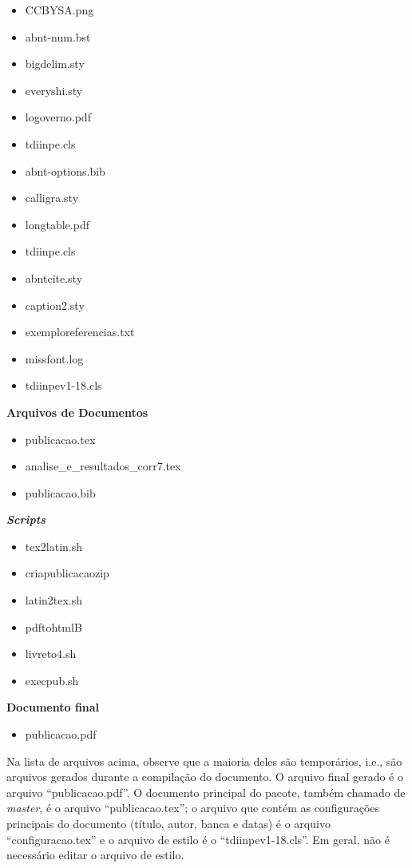 \begin{multicols}{3}
\begin{itemize}
        \item CCBYSA.png
        \item abnt-num.bst
        \item bigdelim.sty
        \item everyshi.sty
        \item logoverno.pdf
        \item tdiinpe.cls
        \item abnt-options.bib
        \item calligra.sty
        \item longtable.pdf
        \item tdiinpe.cls~
        \item abntcite.sty
        \item caption2.sty
        \item exemploreferencias.txt
        \item missfont.log
        \item tdiinpev1-18.cls
    \end{itemize}
    \textbf{Arquivos de Documentos}
    \begin{itemize}
        \item publicacao.tex
        \item analise\_e\_resultados\_corr7.tex
        \item publicacao.bib
    \end{itemize}
    \textbf{\textit{Scripts}}
    \begin{itemize}
        \item tex2latin.sh
        \item criapublicacaozip
        \item latin2tex.sh
        \item pdftohtmlB
        \item livreto4.sh
        \item execpub.sh
    \end{itemize}
    \textbf{Documento final}
    \begin{itemize}
        \item publicacao.pdf
    \end{itemize}
\end{multicols}

Na lista de arquivos acima, observe que a maioria deles são temporários, i.e., são arquivos gerados durante a compilação do documento. O arquivo final gerado é o arquivo ``publicacao.pdf''. O documento principal do pacote, também chamado de \textit{master}, é o arquivo ``publicacao.tex''; o arquivo que contém as configurações principais do documento (título, autor, banca e datas) é o arquivo ``configuracao.tex'' e o arquivo de estilo é o ``tdiinpev1-18.cls''. Em geral, não é necessário editar o arquivo de estilo. 

